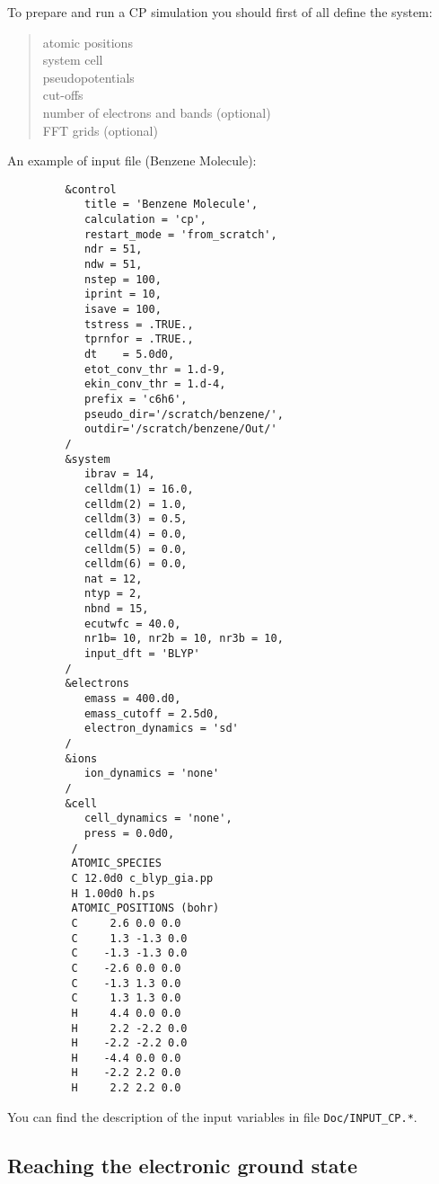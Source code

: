 \documentclass[12pt,a4paper]{article}
\begin{document}
To prepare and run a CP simulation you should first of all
define the system:
  \begin{quote}
    atomic positions\\
    system cell\\
    pseudopotentials\\
    cut-offs\\
    number of electrons and bands (optional)\\
    FFT grids (optional)
  \end{quote}
An example of input file (Benzene Molecule):
\begin{verbatim}
         &control
            title = 'Benzene Molecule',
            calculation = 'cp',
            restart_mode = 'from_scratch',
            ndr = 51,
            ndw = 51,
            nstep = 100,
            iprint = 10,
            isave = 100,
            tstress = .TRUE.,
            tprnfor = .TRUE.,
            dt    = 5.0d0,
            etot_conv_thr = 1.d-9,
            ekin_conv_thr = 1.d-4,
            prefix = 'c6h6',
            pseudo_dir='/scratch/benzene/',
            outdir='/scratch/benzene/Out/'
         /
         &system
            ibrav = 14,
            celldm(1) = 16.0,
            celldm(2) = 1.0,
            celldm(3) = 0.5,
            celldm(4) = 0.0,
            celldm(5) = 0.0,
            celldm(6) = 0.0,
            nat = 12,
            ntyp = 2,
            nbnd = 15,
            ecutwfc = 40.0,
            nr1b= 10, nr2b = 10, nr3b = 10,
            input_dft = 'BLYP'
         /
         &electrons
            emass = 400.d0,
            emass_cutoff = 2.5d0,
            electron_dynamics = 'sd'
         /
         &ions
            ion_dynamics = 'none'
         /
         &cell
            cell_dynamics = 'none',
            press = 0.0d0,
          /
          ATOMIC_SPECIES
          C 12.0d0 c_blyp_gia.pp
          H 1.00d0 h.ps
          ATOMIC_POSITIONS (bohr)
          C     2.6 0.0 0.0
          C     1.3 -1.3 0.0
          C    -1.3 -1.3 0.0
          C    -2.6 0.0 0.0
          C    -1.3 1.3 0.0
          C     1.3 1.3 0.0
          H     4.4 0.0 0.0
          H     2.2 -2.2 0.0
          H    -2.2 -2.2 0.0
          H    -4.4 0.0 0.0
          H    -2.2 2.2 0.0
          H     2.2 2.2 0.0
\end{verbatim} 
You can find the description of the input variables in file 
\texttt{Doc/INPUT\_CP.*}.
 
\subsection{Reaching the electronic ground state}
\end{document}
